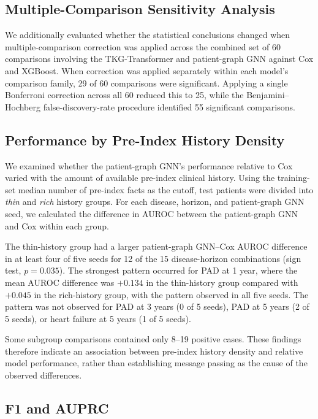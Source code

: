 \subsection{Multiple-Comparison Sensitivity Analysis}

We additionally evaluated whether the statistical conclusions changed when multiple-comparison correction was applied across the combined set of 60 comparisons involving the TKG-Transformer and patient-graph GNN against Cox and XGBoost. When correction was applied separately within each model's comparison family, 29 of 60 comparisons were significant. Applying a single Bonferroni correction across all 60 reduced this to 25, while the Benjamini--Hochberg false-discovery-rate procedure identified 55 significant comparisons.

\subsection{Performance by Pre-Index History Density}
\label{sec:results-history}

We examined whether the patient-graph GNN's performance relative to Cox varied with the amount of available pre-index clinical history. Using the training-set median number of pre-index facts as the cutoff, test patients were divided into \emph{thin} and \emph{rich} history groups. For each disease, horizon, and patient-graph GNN seed, we calculated the difference in AUROC between the patient-graph GNN and Cox within each group.

The thin-history group had a larger patient-graph GNN--Cox AUROC difference in at least four of five seeds for 12 of the 15 disease-horizon combinations (sign test, $p=0.035$). The strongest pattern occurred for PAD at 1 year, where the mean AUROC difference was $+0.134$ in the thin-history group compared with $+0.045$ in the rich-history group, with the pattern observed in all five seeds. The pattern was not observed for PAD at 3 years (0 of 5 seeds), PAD at 5 years (2 of 5 seeds), or heart failure at 5 years (1 of 5 seeds).

Some subgroup comparisons contained only 8--19 positive cases. These findings therefore indicate an association between pre-index history density and relative model performance, rather than establishing message passing as the cause of the observed differences.

\subsection{F1 and AUPRC}
\label{sec:results-f1}


